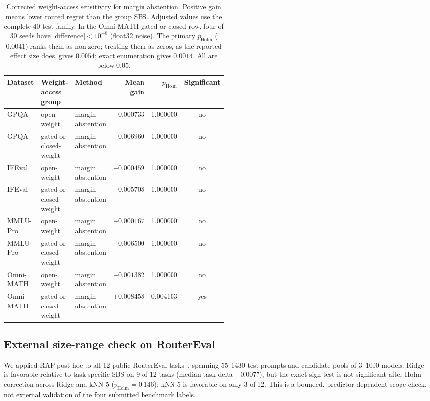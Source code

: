\documentclass{article}
\newcommand{\sbs}{\textsc{SBS}}
\begin{document}
\begin{table}[t]
  \caption{Corrected weight-access sensitivity for margin abstention. Positive gain means lower routed regret than the group \sbs{}. Adjusted values use the complete 40-test family. In the Omni-MATH gated-or-closed row, four of 30 seeds have $|$difference$|<10^{-8}$ (float32 noise). The primary $p_{\text{Holm}}$ ($0.0041$) ranks them as non-zero; treating them as zeros, as the reported effect size does, gives $0.0054$; exact enumeration gives $0.0014$. All are below $0.05$.}
  \label{tab:app-access-group}
  \centering
  \scriptsize
  \setlength{\tabcolsep}{3pt}
  \begin{tabular}{>{\raggedright\arraybackslash}p{0.10\linewidth} >{\raggedright\arraybackslash}p{0.16\linewidth} >{\raggedright\arraybackslash}p{0.26\linewidth} rrc}
    \toprule
    Dataset & Weight-access group & Method & Mean gain & $p_{\text{Holm}}$ & Significant \\
    \midrule
    GPQA & open-weight & margin abstention & $-0.000733$ & 1.000000 & no \\
    GPQA & gated-or-closed-weight & margin abstention & $-0.006960$ & 1.000000 & no \\
    IFEval & open-weight & margin abstention & $-0.000459$ & 1.000000 & no \\
    IFEval & gated-or-closed-weight & margin abstention & $-0.005708$ & 1.000000 & no \\
    MMLU-Pro & open-weight & margin abstention & $-0.000167$ & 1.000000 & no \\
    MMLU-Pro & gated-or-closed-weight & margin abstention & $-0.006500$ & 1.000000 & no \\
    Omni-MATH & open-weight & margin abstention & $-0.001382$ & 1.000000 & no \\
    Omni-MATH & gated-or-closed-weight & margin abstention & $+0.008458$ & 0.004103 & yes \\
    \bottomrule
  \end{tabular}
\end{table}

\subsection{External size-range check on RouterEval}

We applied RAP post hoc to all 12 public RouterEval tasks~\citep{huang2025routereval}, spanning 55--1430 test prompts and candidate pools of 3--1000 models. Ridge is favorable relative to task-specific SBS on 9 of 12 tasks (median task delta $-0.0077$), but the exact sign test is not significant after Holm correction across Ridge and kNN-5 ($p_{\text{Holm}}=0.146$); kNN-5 is favorable on only 3 of 12. This is a bounded, predictor-dependent scope check, not external validation of the four submitted benchmark labels.
\end{document}
